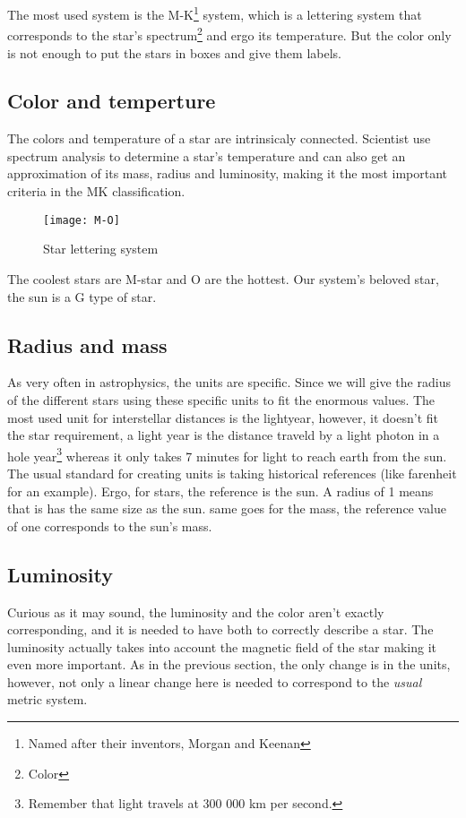 \documentclass[a4paper, 11pt]{article} %
\begin{document}
The most used system is the M-K\footnote{Named after their inventors, Morgan and Keenan} system, which is a lettering system that corresponds to the star's spectrum\footnote{Color} and ergo its temperature. But the color only is not enough to put the stars in boxes and give them labels.  

\subsection{Color and temperture}

The colors and temperature of a star are intrinsicaly connected. Scientist use spectrum analysis to determine a star's temperature and can also get an approximation of its mass, radius and luminosity, making it the most important criteria in the MK classification.



\begin{figure}[h]
\centering
\texttt{[image: M-O]}
\caption{Star lettering system}
\end{figure}

The coolest stars are M-star and O are the hottest. Our system's beloved star, the sun is a G type of star.


\subsection{Radius and mass}

As very often in astrophysics, the units are specific. Since we will give the radius of the different stars using these specific units to fit the enormous values. The most used unit for interstellar distances is the lightyear, however, it doesn't fit the star requirement, a light year is the distance traveld by a light photon in a hole year\footnote{Remember that light travels at 300 000 km per second.} whereas it only takes 7 minutes for light to reach earth from the sun. The usual standard for creating units is taking historical references (like farenheit for an example). Ergo, for stars, the reference is the sun. A radius of 1 means that is has the same size as the sun. same goes for the mass, the reference value of one corresponds to the sun's mass.

\subsection{Luminosity}

Curious as it may sound, the luminosity and the color aren't exactly corresponding, and it is needed to have both to correctly describe a star. The luminosity actually takes into account the magnetic field of the star making it even more important. As in the previous section, the only change is in the units, however, not only a linear change here is needed to correspond to the \textit{usual} metric system.
\end{document}
